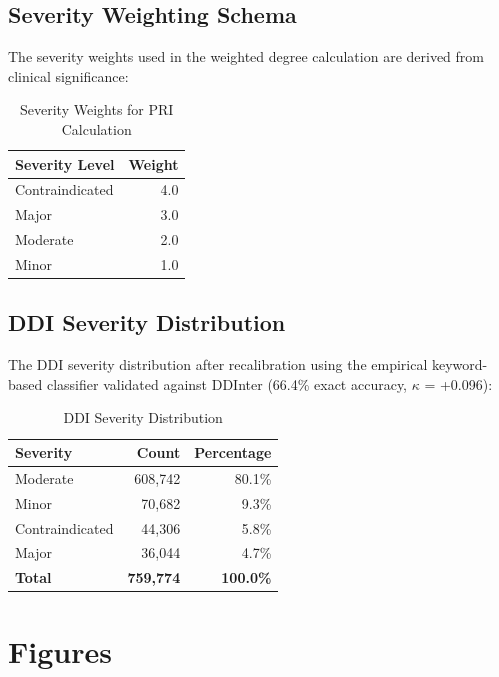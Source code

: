 \documentclass[11pt,a4paper]{article}
\begin{document}
\subsection*{Severity Weighting Schema}

The severity weights used in the weighted degree calculation are derived from clinical significance:

\begin{table}[H]
\centering
\caption{Severity Weights for PRI Calculation}
\label{tab:severity_weights}
\begin{tabular}{lr}
\toprule
\textbf{Severity Level} & \textbf{Weight} \\
\midrule
Contraindicated & 4.0 \\
Major & 3.0 \\
Moderate & 2.0 \\
Minor & 1.0 \\
\bottomrule
\end{tabular}
\end{table}

\subsection*{DDI Severity Distribution}

The DDI severity distribution after recalibration using the empirical keyword-based classifier validated against DDInter (66.4\% exact accuracy, $\kappa$ = +0.096):

\begin{table}[H]
\centering
\caption{DDI Severity Distribution}
\label{tab:severity_distribution}
\begin{tabular}{lrr}
\toprule
\textbf{Severity} & \textbf{Count} & \textbf{Percentage} \\
\midrule
Moderate & 608,742 & 80.1\% \\
Minor & 70,682 & 9.3\% \\
Contraindicated & 44,306 & 5.8\% \\
Major & 36,044 & 4.7\% \\
\midrule
\textbf{Total} & \textbf{759,774} & \textbf{100.0\%} \\
\bottomrule
\end{tabular}
\end{table}

\section*{Figures}
\end{document}
